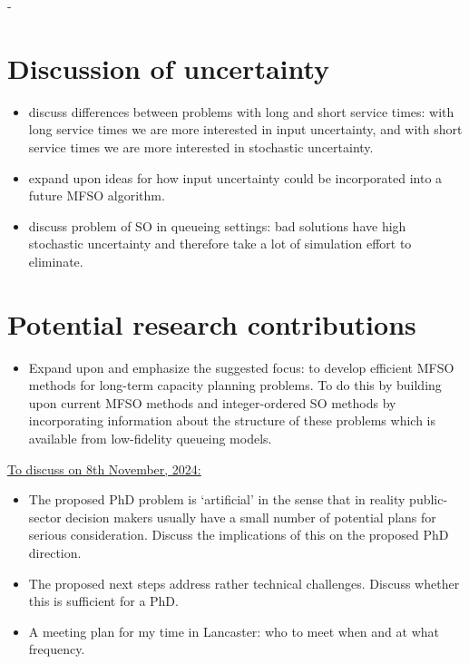 \documentclass[12pt,a4paper]{article}
\begin{document}
- 

\section{Discussion of uncertainty} \label{uncert}
%
\begin{itemize}[noitemsep]
\item discuss differences between problems with long and short service times: with long service times we are more interested in input uncertainty, and with short service times we are more interested in stochastic uncertainty.
\item expand upon ideas for how input uncertainty could be incorporated into a future MFSO algorithm.
\item discuss problem of SO in queueing settings: bad solutions have high stochastic uncertainty and therefore take a lot of simulation effort to eliminate. 
\end{itemize}
%
\section{Potential research contributions} \label{mfso}
\begin{itemize}
\item Expand upon and emphasize the suggested focus: to develop efficient MFSO methods for long-term capacity planning problems. To do this by building upon current MFSO methods and integer-ordered SO methods by incorporating information about the structure of these problems which is available from low-fidelity queueing models. 
\end{itemize}
%
\underline{To discuss on 8th November, 2024:}
\begin{itemize}[noitemsep]
\item The proposed PhD problem is `artificial' in the sense that in reality public-sector decision makers usually have a small number of potential plans for serious consideration. Discuss the implications of this on the proposed PhD direction.
\item The proposed next steps address rather technical challenges. Discuss whether this is sufficient for a PhD.
  \item A meeting plan for my time in Lancaster: who to meet when and at what frequency. 
\end{itemize}
%
\end{document}
